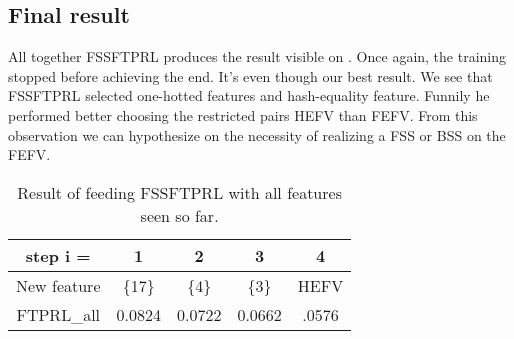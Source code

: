 		\subsection{Final result}
			All together FSSFTPRL produces the result visible on . Once again, the training stopped before achieving the end. It's even though our best result. We see that FSSFTPRL selected one-hotted features and hash-equality feature. Funnily he performed better choosing the restricted pairs HEFV than FEFV. From this observation we can hypothesize on the necessity of realizing a FSS or BSS on the FEFV.



			\begin{table}
				\centering
				\begin{tabular}{c|c|c|c|c}
					step i = & 1 & 2 & 3 & 4 \\
					\hline
					New feature 	& \{17\} & \{4\} & \{3\} & HEFV \\
					FTPRL\_all	&  0.0824 & 0.0722 & 0.0662 & .0576\\
				\end{tabular}
				\caption{Result of feeding FSSFTPRL with all features seen so far. }
				\label{tab:FTPRL_all}
			\end{table}
















